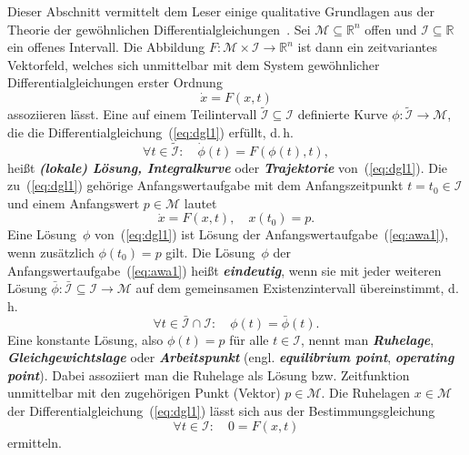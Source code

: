 Dieser Abschnitt vermittelt dem Leser einige qualitative Grundlagen
aus der Theorie der gewöhnlichen Differentialgleichungen~\cite{arnold2001}.
Sei $\mathcal{M}\subseteq{\mathbb{R}}^{n}$ offen und $\mathcal{I}\subseteq{\mathbb{R}}$
ein offenes Intervall. Die Abbildung $F:\mathcal{M}\times\mathcal{I}\to{\mathbb{R}}^{n}$
ist dann ein zeitvariantes Vektorfeld, welches sich unmittelbar mit
dem System gewöhnlicher Differentialgleichungen erster Ordnung
\begin{equation}
\dot{x}=F(x,t)\label{eq:dgl1}
\end{equation}
assoziieren lässt.
Eine auf einem Teilintervall $\tilde{\mathcal{I}}\subseteq\mathcal{I}$
definierte Kurve $\phi:\tilde{\mathcal{I}}\to\mathcal{M}$, die die
Differentialgleichung~(\ref{eq:dgl1}) erfüllt, d.\,h.
\[
\forall t\in\tilde{\mathcal{I}}:\quad\dot{\phi}(t)=F(\phi(t),t),
\]
heißt \textbf{\em (lokale) Lösung, Integralkurve}
oder \textbf{\em Trajektorie} von~(\ref{eq:dgl1}).
Die zu~(\ref{eq:dgl1}) gehörige Anfangswertaufgabe
mit dem Anfangszeitpunkt $t=t_{0}\in\mathcal{I}$ und einem Anfangswert
$p\in\mathcal{M}$ lautet
\begin{equation}
\dot{x}=F(x,t),\quad x(t_{0})=p.\label{eq:awa1}
\end{equation}
Eine Lösung~$\phi$ von~(\ref{eq:dgl1}) ist Lösung der Anfangswertaufgabe~(\ref{eq:awa1}),
wenn zusätzlich $\phi(t_{0})=p$ gilt. Die Lösung~$\phi$ der Anfangswertaufgabe~(\ref{eq:awa1})
heißt \textbf{\em eindeutig}, wenn sie mit jeder weiteren Lösung $\bar{\phi}:\bar{\mathcal{I}}\subseteq\mathcal{I}\to\mathcal{M}$
auf dem gemeinsamen Existenzintervall übereinstimmt, d.\,h.
\[
\forall t\in\bar{\mathcal{I}}\cap\mathcal{I}:\quad\phi(t)=\bar{\phi}(t).
\]
Eine konstante Lösung, also $\phi(t)=p$ für alle $t\in\mathcal{I}$,
nennt man \textbf{\em Ruhelage}, \textbf{\em Gleichgewichtslage}
oder \textbf{\em Arbeitspunkt} (engl. \textbf{\em equilibrium
point}, \textbf{\em operating point}). Dabei assoziiert man die Ruhelage
als Lösung bzw. Zeitfunktion unmittelbar mit den zugehörigen Punkt
(Vektor) $p\in\mathcal{M}$.
Die Ruhelagen $x\in\mathcal{M}$ der
Differentialgleichung~(\ref{eq:dgl1}) lässt sich aus der Bestimmungsgleichung
\[
\forall t\in\mathcal{I}:\quad0=F(x,t)
\]
ermitteln.
